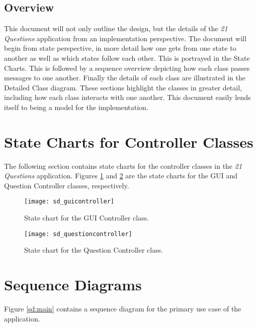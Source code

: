 \documentclass[titlepage]{article}
\begin{document}

\subsection{Overview}
\label{sub:overview}


This document will not only outline the design, but the details of the \textit{21 Questions} application from an implementation perspective. The document will begin from state perspective, in more detail how one gets from one state to another as well as which states follow each other. This is portrayed in the State Charts. This is followed by a sequence overview depicting how each class passes messages to one another. Finally the details of each class are 
illustrated in the Detailed Class diagram. These sections highlight the classes in greater detail, including how each class interacts with one another. This document easily lends itself to being a model for the implementation.



\section{State Charts for Controller Classes}
\label{sec:state_charts_for_controller_classes}
The following section contains state charts for the controller classes in the \textit{21 Questions} application. Figures \ref{sc:gui} and \ref{sc:question} are the state charts for the GUI and Question Controller classes, respectively.

\begin{figure}
\texttt{[image: sd\_guicontroller]}
\caption{State chart for the GUI Controller class.}\label{sc:gui}
\end{figure}

\begin{figure}
\texttt{[image: sd\_questioncontroller]}
\caption{State chart for the Question Controller class.}\label{sc:question}
\end{figure}

\section{Sequence Diagrams}
\label{sec:sequence_diagrams}
Figure \ref{sd:main} contains a sequence diagram for the primary use case of the application.
\end{document}
